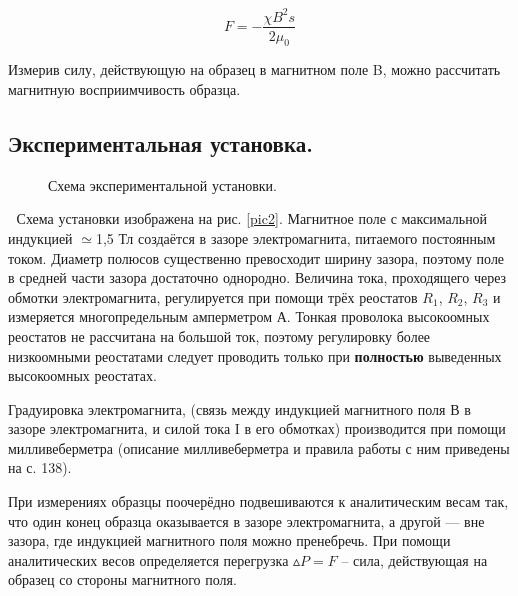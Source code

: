 \documentclass[a4paper,12pt]{article} %
\begin{document}
\begin{equation}\label{eq4}
F = - \frac{\chi B^2 s}{2 \mu_0}
\end{equation}

Измерив силу, действующую на образец в магнитном поле B, можно рассчитать магнитную восприимчивость образца.

\subsection{Экспериментальная установка.}

\begin{figure}[H]\label{pic2}
	\caption{Схема экспериментальной установки.}
\end{figure}

Схема установки изображена на рис. \eqref{pic2}. Магнитное поле с максимальной индукцией $\simeq$1,5 Тл создаётся в зазоре электромагнита, питаемого постоянным током. Диаметр полюсов существенно превосходит ширину зазора, поэтому поле в средней части зазора достаточно однородно. Величина тока, проходящего через обмотки электромагнита, регулируется при помощи трёх реостатов $R_1$, $R_2$, $R_3$ и измеряется многопредельным амперметром А. Тонкая проволока высокоомных реостатов не рассчитана на большой ток, поэтому регулировку более низкоомными реостатами следует проводить только при \textbf{полностью} выведенных высокоомных реостатах.

Градуировка электромагнита, (связь между индукцией магнитного поля В в зазоре электромагнита, и силой тока I в его обмотках) производится при помощи милливеберметра (описание милливеберметра и правила работы с ним приведены на с. 138).

При измерениях образцы поочерёдно подвешиваются к аналитическим весам так, что один конец образца оказывается в зазоре электромагнита, а другой — вне зазора, где индукцией магнитного поля можно пренебречь. При помощи аналитических весов определяется перегрузка $\vartriangle P = F$ -- сила, действующая на образец со стороны магнитного поля.
\end{document}
